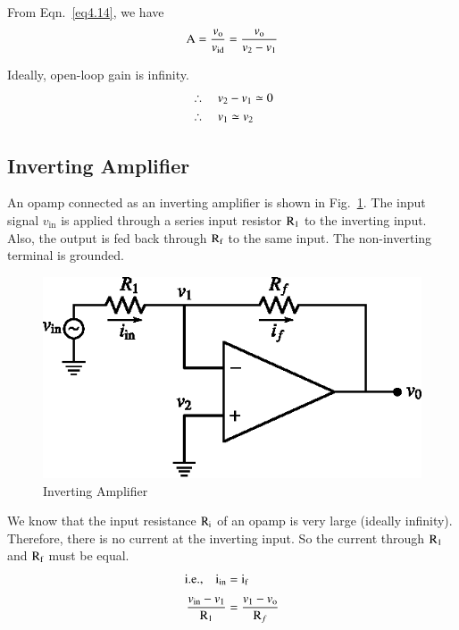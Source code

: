 From Eqn.~\eqref{eq4.14}, we have
\begin{equation}
\textrm{A} =\frac{v_{\textrm{o}}}{v_{\operatorname{id}}}=\frac{v_{\textrm{o}}}{v_{2}-v_{1}}\label{eq4.15}
\end{equation}

Ideally, open-loop gain is infinity.
\begin{align}
&\therefore\quad v_{2}-v_{1}\simeq 0\notag\\
&\therefore\quad v_{1}\simeq v_{2}\label{eq4.16}
\end{align}

\subsection{Inverting Amplifier}\label{sec4.6.1}

An opamp connected as an inverting amplifier is shown in Fig.~\ref{fig4.7}. The input signal $v_{\text{in}}$ is applied through a series input resistor $\textrm{R}_{1}$ to the inverting input. Also, the output is fed back through $\textrm{R}_{\textrm{f}}$ to the same input. The non-inverting terminal is grounded.
\begin{figure}[H]
\centering
\includegraphics{chap4/fig4.7.eps}
\caption{Inverting Amplifier}\label{fig4.7}
\end{figure}

We know that the input resistance $\textrm{R}_{\textrm{i}}$ of an opamp is very large (ideally infinity). Therefore, there is no current at the inverting input. So the current through $\textrm{R}_{1}$ and $\textrm{R}_{\textrm{f}}$ must be equal.
\begin{align}
\text{i.e.,}\quad \textrm{i}_{\text{in}} &= \textrm{i}_{\textrm{f}}\label{eq4.17}\\[3pt]
\frac{v_{\text{in}}-v_{1}}{\textrm{R}_{1}} &= \frac{v_{1}-v_{\textrm{o}}}{\textrm{R}_{f}}\label{eq4.18}
\end{align}

